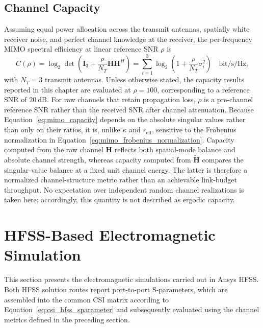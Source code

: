 \subsection{Channel Capacity}
Assuming equal power allocation across the transmit antennas, spatially white receiver noise, and perfect channel knowledge at the receiver, the per-frequency MIMO spectral efficiency at linear reference SNR $\rho$ is
\begin{equation}
    C(\rho) = \log_2\det\!\left(\mathbf{I}_{3} + \frac{\rho}{N_T}\mathbf{H}\mathbf{H}^{H}\right)
    = \sum_{i=1}^{3}\log_2\!\left(1+\frac{\rho}{N_T}\sigma_i^{2}\right)
    \quad\text{bit/s/Hz},
    \label{eq:mimo_capacity}
\end{equation}
with $N_T=3$ transmit antennas. Unless otherwise stated, the capacity results reported in this chapter are evaluated at $\rho=100$, corresponding to a reference SNR of $20~\mathrm{dB}$. For raw channels that retain propagation loss, $\rho$ is a pre-channel reference SNR rather than the received SNR after channel attenuation. Because Equation~\ref{eq:mimo_capacity} depends on the absolute singular values rather than only on their ratios, it is, unlike $\kappa$ and $r_{\mathrm{eff}}$, sensitive to the Frobenius normalization in Equation~\ref{eq:mimo_frobenius_normalization}. Capacity computed from the raw channel $\mathbf{H}$ reflects both spatial-mode balance and absolute channel strength, whereas capacity computed from $\widetilde{\mathbf{H}}$ compares the singular-value balance at a fixed unit channel energy. The latter is therefore a normalized channel-structure metric rather than an achievable link-budget throughput. No expectation over independent random channel realizations is taken here; accordingly, this quantity is not described as ergodic capacity.

\section{HFSS-Based Electromagnetic Simulation}
This section presents the electromagnetic simulations carried out in Ansys HFSS. Both HFSS solution routes report port-to-port S-parameters, which are assembled into the common CSI matrix according to Equation~\ref{eq:csi_hfss_sparameter} and subsequently evaluated using the channel metrics defined in the preceding section.

